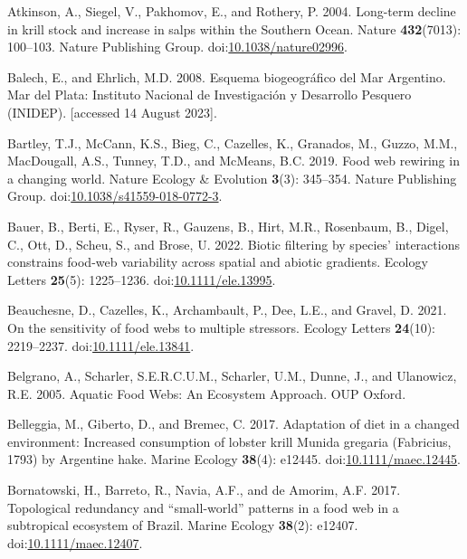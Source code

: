 \documentclass[
]{article}
\newlength{\cslhangindent}
\newenvironment{CSLReferences}[2] %
 {\begin{list}{}{%
  \setlength{\itemindent}{0pt}
  \setlength{\leftmargin}{0pt}
  \setlength{\parsep}{0pt}
  \ifodd #1
   \setlength{\leftmargin}{\cslhangindent}
   \setlength{\itemindent}{-1\cslhangindent}
  \fi
  \setlength{\itemsep}{#2\baselineskip}}}
 {\end{list}}
\begin{document}
\begin{CSLReferences}{1}{0}
Atkinson, A., Siegel, V., Pakhomov, E., and Rothery, P. 2004. Long-term
decline in krill stock and increase in salps within the {Southern
Ocean}. Nature \textbf{432}(7013): 100--103. Nature Publishing Group.
doi:\href{https://doi.org/10.1038/nature02996}{10.1038/nature02996}.

Balech, E., and Ehrlich, M.D. 2008. {Esquema biogeogr{á}fico del Mar
Argentino}. Mar del Plata: Instituto Nacional de Investigaci{ó}n y
Desarrollo Pesquero (INIDEP). {[}accessed 14 August 2023{]}.

Bartley, T.J., McCann, K.S., Bieg, C., Cazelles, K., Granados, M.,
Guzzo, M.M., MacDougall, A.S., Tunney, T.D., and McMeans, B.C. 2019.
Food web rewiring in a changing world. Nature Ecology \& Evolution
\textbf{3}(3): 345--354. Nature Publishing Group.
doi:\href{https://doi.org/10.1038/s41559-018-0772-3}{10.1038/s41559-018-0772-3}.

Bauer, B., Berti, E., Ryser, R., Gauzens, B., Hirt, M.R., Rosenbaum, B.,
Digel, C., Ott, D., Scheu, S., and Brose, U. 2022. Biotic filtering by
species' interactions constrains food-web variability across spatial and
abiotic gradients. Ecology Letters \textbf{25}(5): 1225--1236.
doi:\href{https://doi.org/10.1111/ele.13995}{10.1111/ele.13995}.

Beauchesne, D., Cazelles, K., Archambault, P., Dee, L.E., and Gravel, D.
2021. On the sensitivity of food webs to multiple stressors. Ecology
Letters \textbf{24}(10): 2219--2237.
doi:\href{https://doi.org/10.1111/ele.13841}{10.1111/ele.13841}.

Belgrano, A., Scharler, S.E.R.C.U.M., Scharler, U.M., Dunne, J., and
Ulanowicz, R.E. 2005. Aquatic {Food Webs}: {An Ecosystem Approach}. OUP
Oxford.

Belleggia, M., Giberto, D., and Bremec, C. 2017. Adaptation of diet in a
changed environment: {Increased} consumption of lobster krill {Munida}
gregaria ({Fabricius}, 1793) by {Argentine} hake. Marine Ecology
\textbf{38}(4): e12445.
doi:\href{https://doi.org/10.1111/maec.12445}{10.1111/maec.12445}.

Bornatowski, H., Barreto, R., Navia, A.F., and de Amorim, A.F. 2017.
Topological redundancy and {``small-world''} patterns in a food web in a
subtropical ecosystem of {Brazil}. Marine Ecology \textbf{38}(2):
e12407.
doi:\href{https://doi.org/10.1111/maec.12407}{10.1111/maec.12407}.


\end{CSLReferences}
\end{document}
